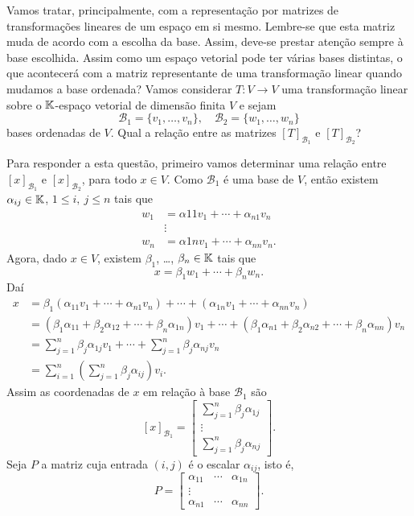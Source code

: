 Vamos tratar, principalmente, com a representação por matrizes de transformações lineares de um espaço em si mesmo. Lembre-se que esta matriz muda de acordo com a escolha da base. Assim, deve-se prestar atenção sempre à base escolhida. Assim como um espaço vetorial pode ter várias bases distintas, o que acontecerá com a matriz representante de uma transformação linear quando mudamos a base ordenada? Vamos considerar $T : V \to V$ uma transformação linear sobre o $\mathbb{K}$-espaço vetorial de dimensão finita $V$ e sejam
\[
	\mathcal{B}_1 = \{v_1,\dots,v_n\}, \quad \mathcal{B}_2 = \{w_1,\dots,w_n\}
\]
bases ordenadas de $V$. Qual a relação entre as matrizes $[T]_{\mathcal{B}_1}$ e $[T]_{\mathcal{B}_2}$?

Para responder a esta questão, primeiro vamos determinar uma relação entre $[x]_{\mathcal{B}_1}$ e $[x]_{\mathcal{B}_2}$, para todo $x \in V$. Como $\mathcal{B}_1$ é uma base de $V$, então existem $\alpha_{ij} \in \mathbb{K}$, $1 \le i,\ j \le n$ tais que
\begin{align*}
	w_1 &= \alpha{11}v_1 + \cdots + \alpha_{n1}v_n\\
	&\vdots\\
	w_n &= \alpha{1n}v_1 + \cdots + \alpha_{nn}v_n.
\end{align*}
Agora, dado $x \in V$, existem $\beta_1$, \dots, $\beta_n \in \mathbb{K}$ tais que
\[
	x = \beta_1w_1 + \cdots + \beta_nw_n.
\]
Daí
\begin{align*}
	x &= \beta_1(\alpha_{11}v_1 + \cdots + \alpha_{n1}v_n) + \cdots + (\alpha_{1n}v_1 + \cdots + \alpha_{nn}v_n)\\
	&= (\beta_1\alpha_{11} + \beta_2\alpha_{12} + \cdots + \beta_n\alpha_{1n})v_1 + \cdots + (\beta_1\alpha_{n1} + \beta_2\alpha_{n2} + \cdots + \beta_n\alpha_{nn})v_n\\
	&= \sum_{j=1}^n\beta_j\alpha_{1j}v_1 + \cdots + \sum_{j=1}^n\beta_j\alpha_{nj}v_n\\
	&= \sum_{i=1}^n\left(\sum_{j=1}^n\beta_j\alpha_{ij}\right)v_i.
\end{align*}
Assim as coordenadas de $x$ em relação à base $\mathcal{B}_1$ são
\[
	[x]_{\mathcal{B}_1} = \begin{bmatrix}
		\sum_{j=1}^n\beta_j\alpha_{1j}\\
		\vdots\\
		\sum_{j=1}^n\beta_j\alpha_{nj}
	\end{bmatrix}.
\]
Seja $P$ a matriz cuja entrada $(i,j)$ é o escalar $\alpha_{ij}$, isto é,
\[
	P = \begin{bmatrix}
		\alpha_{11} & \cdots & \alpha_{1n}\\
		\vdots\\
		\alpha_{n1} & \cdots & \alpha_{nn}
	\end{bmatrix}.
\]
